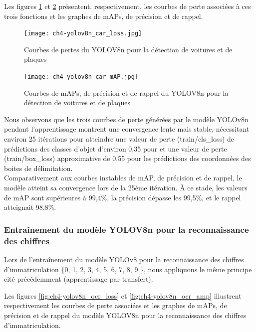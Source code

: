 Les figures \ref{fig:ch4-yolov8n_car_loss} et \ref{fig:ch4-yolov8n_car_mAP} présentent, respectivement, les courbes de perte associées à ces trois fonctions et les graphes de mAPs, de précision et de rappel.





\begin{figure}[H]
	\centering
	\texttt{[image: ch4-yolov8n\_car\_loss.jpg]}
	\caption{Courbes de pertes du YOLOV8n pour la détection de voitures et de plaques }
\label{fig:ch4-yolov8n_car_loss}
\end{figure}

\begin{figure}[H]
	\centering
	\texttt{[image: ch4-yolov8n\_car\_mAP.jpg]}
	\caption{Courbes de mAPs, de précision et de rappel du YOLOV8n pour la détection de voitures et de plaques}
\label{fig:ch4-yolov8n_car_mAP}
\end{figure}

Nous observons que les trois courbes de perte générées par le modèle YOLOv8n pendant l'apprentissage montrent une convergence lente mais stable, nécessitant environ 25 itérations pour atteindre une valeur de perte (train/cls\_loss) de prédictions des classes d'objet d'environ 0,35 pour et une valeur de perte (train/box\_loss) approximative de 0.55  pour les prédictions des coordonnées des boites de délimitation.\\
Comparativement aux courbes instables de mAP, de précision et de rappel, le modèle atteint sa convergence lors de la 25ème itération. À ce stade, les valeurs de mAP sont supérieures à 99,4\%, la précision dépasse les 99,5\%, et le rappel atteignait 98,8\%.


\subsubsection{Entraînement du modèle YOLOV8n pour la reconnaissance des chiffres}

Lors de l'entraînement du modèle YOLOv8 pour la reconnaissance des chiffres d'immatriculation \{0, 1, 2, 3, 4, 5, 6, 7, 8, 9 \}, nous appliquons le même principe cité précédemment (apprentissage par transfert).

Les figures \ref{fig:ch4-yolov8n_ocr_loss} et \ref{fig:ch4-yolov8n_ocr_amp} illustrent respectivement les courbes de perte associées et les graphes de mAPs, de précision et de rappel du modèle YOLOV8n pour la reconnaissance des chiffres d'immatriculation.

